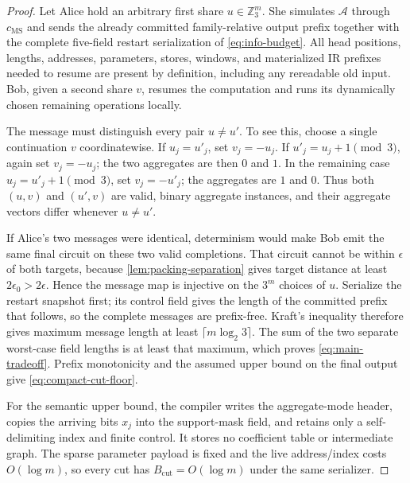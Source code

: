 \documentclass[aps,prx,reprint,floatfix,superscriptaddress]{revtex4-2}
\begin{document}
\begin{proof}
Let Alice hold an arbitrary first share $u\in\mathbb Z_3^m$.  She simulates
$\mathcal A$ through $c_{\mathrm{MS}}$ and sends the already committed
family-relative output prefix together with the complete five-field restart
serialization of \eqref{eq:info-budget}.  All head positions, lengths,
addresses, parameters, stores, windows, and materialized IR prefixes needed
to resume are present by definition, including any rereadable old input.
Bob, given a second share $v$, resumes the computation and runs its
dynamically chosen remaining operations locally.

The message must distinguish every pair $u\neq u'$.  To see this, choose a
single continuation $v$ coordinatewise.  If $u_j=u'_j$, set
$v_j=-u_j$.  If $u'_j=u_j+1\pmod3$, again set $v_j=-u_j$; the two aggregates
are then $0$ and $1$.  In the remaining case
$u_j=u'_j+1\pmod3$, set $v_j=-u'_j$; the aggregates are $1$ and $0$.
Thus both $(u,v)$ and $(u',v)$ are valid, binary aggregate instances, and
their aggregate vectors differ whenever $u\neq u'$.

If Alice's two messages were identical, determinism would make Bob emit the
same final circuit on these two valid completions.  That circuit cannot be
within $\epsilon$ of both targets, because
\cref{lem:packing-separation} gives target distance at least
$2\epsilon_0>2\epsilon$.  Hence the message map is injective on the
$3^m$ choices of $u$.  Serialize the restart snapshot first; its control
field gives the length of the committed prefix that follows, so the complete
messages are prefix-free.  Kraft's inequality therefore gives maximum
message length at least $\lceil m\log_2 3\rceil$.  The sum of the two
separate worst-case field lengths is at least that maximum, which proves
\eqref{eq:main-tradeoff}.  Prefix monotonicity and the assumed
upper bound on the final output give \eqref{eq:compact-cut-floor}.

For the semantic upper bound, the compiler writes the aggregate-mode header,
copies the arriving bits $x_j$ into the support-mask field, and retains only
a self-delimiting index and finite control.  It stores no coefficient table
or intermediate graph.  The sparse parameter payload is fixed and the live
address/index costs $O(\log m)$, so every cut has
$B_{\mathrm{cut}}=O(\log m)$ under the same serializer.


\end{proof}
\end{document}

